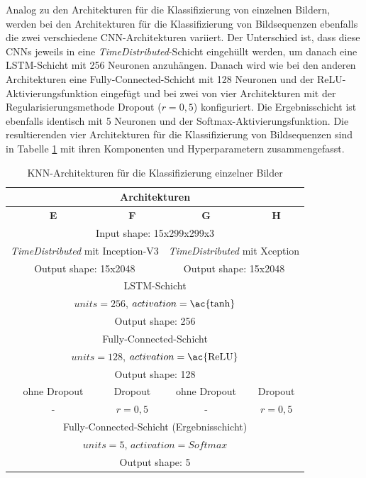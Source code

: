 Analog zu den Architekturen für die Klassifizierung von einzelnen Bildern, werden bei den Architekturen für die Klassifizierung von Bildsequenzen ebenfalls die zwei verschiedene \ac{CNN}-Architekturen variiert. Der Unterschied ist, dass diese \acp{CNN} jeweils in eine \textit{TimeDistributed}-Schicht eingehüllt werden, um danach eine \ac{LSTM}-Schicht mit 256 Neuronen anzuhängen. Danach wird wie bei den anderen Architekturen eine Fully-Connected-Schicht mit 128 Neuronen und der \ac{ReLU}-Aktivierungsfunktion eingefügt und bei zwei von vier Architekturen mit der Regularisierungsmethode Dropout ($r=0,5$) konfiguriert. Die Ergebnisschicht ist ebenfalls identisch mit 5 Neuronen und der Softmax-Aktivierungsfunktion. Die resultierenden vier Architekturen für die Klassifizierung von Bildsequenzen sind in Tabelle \ref{tab_architekturen_video} mit ihren Komponenten und Hyperparametern zusammengefasst.

\begin{table}[h]
\centering
\def\arraystretch{1.4}
\begin{tabular}{|c|c|c|c|}
\hline
\multicolumn{4}{|c|}{\textbf{Architekturen}} \\
\hline
\textbf{E} & \textbf{F} & \textbf{G} & \textbf{H} \\
\hline
\hline
\multicolumn{4}{|c|}{Input shape: 15x299x299x3} \\
\hline
\multicolumn{2}{|c|}{\textit{TimeDistributed} mit Inception-V3} & \multicolumn{2}{|c|}{\textit{TimeDistributed} mit Xception} \\
\multicolumn{2}{|c|}{Output shape: 15x2048} & \multicolumn{2}{|c|}{Output shape: 15x2048} \\
\hline
\multicolumn{4}{|c|}{\ac{LSTM}-Schicht} \\
\multicolumn{4}{|c|}{$units=256$, $activation=\text{\ac{tanh}}$} \\
\multicolumn{4}{|c|}{Output shape: 256} \\
\hline
\multicolumn{4}{|c|}{Fully-Connected-Schicht} \\
\multicolumn{4}{|c|}{$units=128$, $activation=\text{\ac{ReLU}}$} \\
\multicolumn{4}{|c|}{Output shape: 128} \\
\hline
ohne Dropout & Dropout & ohne Dropout & Dropout \\
- & $r=0,5$ & - & $r=0,5$ \\
\hline
\multicolumn{4}{|c|}{Fully-Connected-Schicht (Ergebnisschicht)} \\
\multicolumn{4}{|c|}{$units=5$, $activation=Softmax$} \\
\multicolumn{4}{|c|}{Output shape: 5} \\
\hline
\end{tabular}
\caption{\ac{KNN}-Architekturen für die Klassifizierung einzelner Bilder}
\label{tab_architekturen_video}
\end{table}













 


 
 

